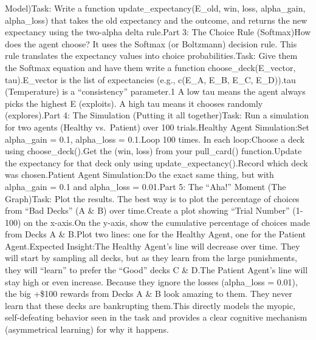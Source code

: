 \documentclass[
]{article}
\begin{document}
Model)Task: Write a function update\_expectancy(E\_old, win, loss,
alpha\_gain, alpha\_loss) that takes the old expectancy and the outcome,
and returns the new expectancy using the two-alpha delta rule.Part 3:
The Choice Rule (Softmax)How does the agent choose? It uses the Softmax
(or Boltzmann) decision rule. This rule translates the expectancy values
into choice probabilities.Task: Give them the Softmax equation and have
them write a function choose\_deck(E\_vector, tau).E\_vector is the list
of expectancies (e.g., c(E\_A, E\_B, E\_C, E\_D)).tau (Temperature) is a
``consistency'' parameter.1 A low tau means the agent always picks the
highest E (exploits). A high tau means it chooses randomly
(explores).Part 4: The Simulation (Putting it all together)Task: Run a
simulation for two agents (Healthy vs.~Patient) over 100 trials.Healthy
Agent Simulation:Set alpha\_gain = 0.1, alpha\_loss = 0.1.Loop 100
times. In each loop:Choose a deck using choose\_deck().Get the (win,
loss) from your pull\_card() function.Update the expectancy for that
deck only using update\_expectancy().Record which deck was
chosen.Patient Agent Simulation:Do the exact same thing, but with
alpha\_gain = 0.1 and alpha\_loss = 0.01.Part 5: The ``Aha!'' Moment
(The Graph)Task: Plot the results. The best way is to plot the
percentage of choices from ``Bad Decks'' (A \& B) over time.Create a
plot showing ``Trial Number'' (1-100) on the x-axis.On the y-axis, show
the cumulative percentage of choices made from Decks A \& B.Plot two
lines: one for the Healthy Agent, one for the Patient Agent.Expected
Insight:The Healthy Agent's line will decrease over time. They will
start by sampling all decks, but as they learn from the large
punishments, they will ``learn'' to prefer the ``Good'' decks C \& D.The
Patient Agent's line will stay high or even increase. Because they
ignore the losses (alpha\_loss = 0.01), the big +\$100 rewards from
Decks A \& B look amazing to them. They never learn that these decks are
bankrupting them.This directly models the myopic, self-defeating
behavior seen in the task and provides a clear cognitive mechanism
(asymmetrical learning) for why it happens.
\end{document}
